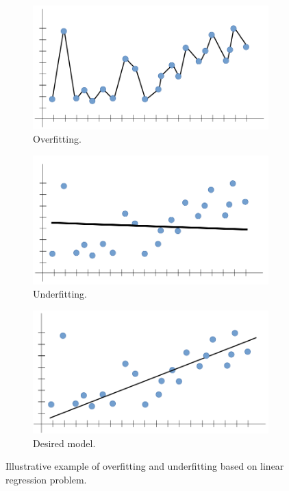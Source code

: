 \documentclass[parskip=half,notes,cadrem,toolver]{iisvlsi}
\begin{document}
\begin{figure}[H]
     \centering
     \begin{subfigure}[b]{0.3\textwidth}
         \centering
         \includegraphics[width=\textwidth]{figures/overfitting.png}
         \caption{Overfitting.}
         \label{fig:overfitting}
     \end{subfigure}
     \hfill
     \begin{subfigure}[b]{0.3\textwidth}
         \centering
         \includegraphics[width=\textwidth]{figures/underfitting.png}
         \caption{Underfitting.}
         \label{fig:underfitting}
     \end{subfigure}
     \hfill
     \begin{subfigure}[b]{0.3\textwidth}
         \centering
         \includegraphics[width=\textwidth]{figures/good.png}
         \caption{Desired model.}
         \label{fig:good}
     \end{subfigure}
        \caption{Illustrative example of overfitting and underfitting based on linear regression problem.}
        \label{fig:under-over-fitting}
\end{figure}
\end{document}
